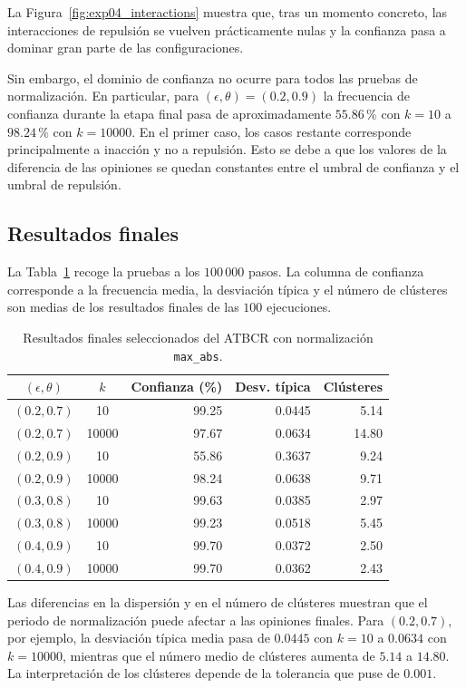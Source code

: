 \documentclass[11pt,a4paper]{article}
\begin{document}
La Figura~\ref{fig:exp04_interactions} muestra que, tras un momento concreto, las interacciones de repulsión se vuelven prácticamente nulas y la confianza pasa a dominar gran parte de las configuraciones. 

Sin embargo, el dominio de confianza no ocurre para todos las pruebas de normalización. En particular, para $(\epsilon,\theta)=(0.2,0.9)$ la frecuencia de confianza durante la etapa final pasa de aproximadamente $55.86\,\text{\%}$ con $k=10$ a $98.24\,\text{\%}$ con $k=10000$. En el primer caso, los casos restante corresponde principalmente a inacción y no a repulsión. Esto se debe a que los valores de la diferencia de las opiniones se quedan constantes entre el umbral de confianza y el umbral de repulsión.

\subsection{Resultados finales}

La Tabla~\ref{tab:exp04_selected} recoge la pruebas a los $100\,000$ pasos. La columna de confianza corresponde a la frecuencia media, la desviación típica y el número de clústeres son medias de los resultados finales de las $100$ ejecuciones.

\begin{table}[htbp]
\centering
\caption{Resultados finales seleccionados del ATBCR con normalización
\texttt{max\_abs}.}
\label{tab:exp04_selected}
\small
\begin{tabular}{ccrrr}
\toprule
$(\epsilon,\theta)$ & $k$ & Confianza (\%) & Desv. típica & Clústeres \\
\midrule
$(0.2,0.7)$ & 10    & 99.25 & 0.0445 & 5.14 \\
$(0.2,0.7)$ & 10000 & 97.67 & 0.0634 & 14.80 \\
$(0.2,0.9)$ & 10    & 55.86 & 0.3637 & 9.24 \\
$(0.2,0.9)$ & 10000 & 98.24 & 0.0638 & 9.71 \\
$(0.3,0.8)$ & 10    & 99.63 & 0.0385 & 2.97 \\
$(0.3,0.8)$ & 10000 & 99.23 & 0.0518 & 5.45 \\
$(0.4,0.9)$ & 10    & 99.70 & 0.0372 & 2.50 \\
$(0.4,0.9)$ & 10000 & 99.70 & 0.0362 & 2.43 \\
\bottomrule
\end{tabular}
\end{table}

Las diferencias en la dispersión y en el número de clústeres muestran que el periodo de normalización puede afectar a las opiniones finales. Para $(0.2,0.7)$, por ejemplo, la desviación típica media pasa de $0.0445$ con $k=10$ a $0.0634$ con $k=10000$, mientras que el número medio de clústeres aumenta de $5.14$ a $14.80$. La interpretación de los clústeres depende de la tolerancia que puse de $0.001$.
\end{document}
